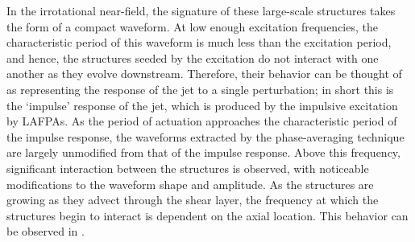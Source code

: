 In the irrotational near-field, the signature of these large-scale structures takes the form of a compact waveform. 
At low enough excitation frequencies, the characteristic period of this waveform is much less than the excitation period, and hence, the structures seeded by the excitation do not interact with one another as they evolve downstream. 
Therefore, their behavior can be thought of as representing the response of the jet to a single perturbation; in short this is the `impulse' response of the jet, which is produced by the impulsive excitation by LAFPAs.
As the period of actuation approaches the characteristic period of the impulse response, the waveforms extracted by the phase-averaging technique are largely unmodified from that of the impulse response. 
Above this frequency, significant interaction between the structures is observed, with noticeable modifications to the waveform shape and amplitude. 
As the structures are growing as they advect through the shear layer, the frequency at which the structures begin to interact is dependent on the axial location.
This behavior can be observed in .
